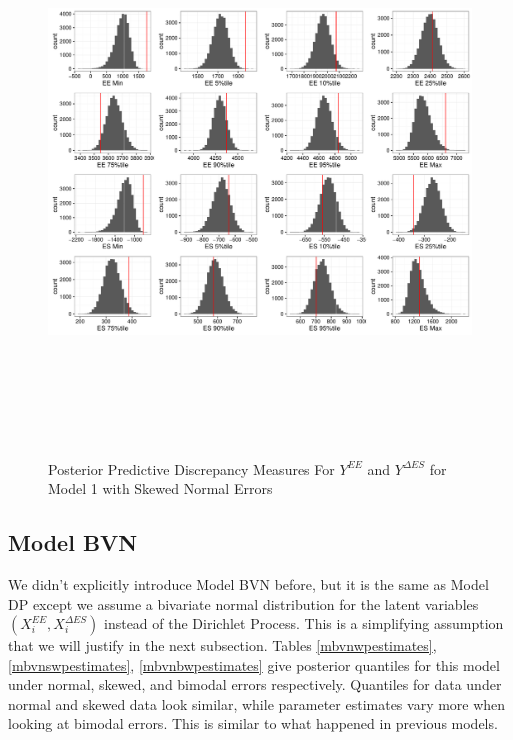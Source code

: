 \documentclass[11pt]{article}\usepackage[]{graphicx}\usepackage[]{color}
\begin{document}
  \begin{figure}
  \centering
  \includegraphics[width=17cm,height=15cm]{manual_figure/wpydiag1s.pdf}
  \caption{Posterior Predictive Discrepancy Measures For $Y^{EE}$ and $Y^{\Delta ES}$ for Model 1 with Skewed Normal Errors}
  \label{wpydiag1s}
  \end{figure}


\subsection{Model BVN}
% 
We didn't explicitly introduce Model BVN before, but it is the same as Model DP except we assume a bivariate normal distribution for the latent variables $(X_i^{EE},X_i^{\Delta ES})$ instead of the Dirichlet Process. This is a simplifying assumption that we will justify in the next subsection. Tables \ref{mbvnwpestimates}, \ref{mbvnswpestimates}, \ref{mbvnbwpestimates} give posterior quantiles for this model under normal, skewed, and bimodal errors respectively. Quantiles for data under normal and skewed data look similar, while parameter estimates vary more when looking at bimodal errors. This is similar to what happened in previous models. 
\end{document}
